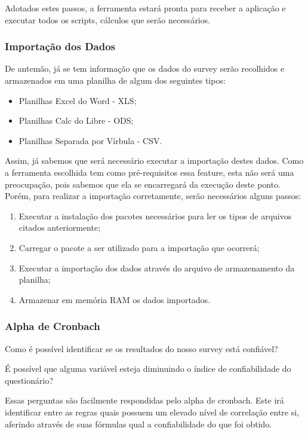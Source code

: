Adotados estes passos, a ferramenta estará pronta para receber a aplicação e executar todos os scripts, cálculos que serão
necessários.

\subsubsection{Importação dos Dados}
\label{sub:importa_o_dos_dados}
De antemão, já se tem informação que  os dados do survey serão recolhidos e armazenados em uma planilha de algum dos seguintes tipos:

\begin{itemize}
    \item Planilhas Excel do Word - XLS;
    \item Planilhas Calc do Libre - ODS;
    \item Planilhas Separada por Vírbula - CSV.
\end{itemize}

Assim, já sabemos que será necessário executar a importação destes dados. Como a ferramenta escolhida tem como pré-requisitos
essa feature, esta não será uma preocupação, pois sabemos que ela se encarregará da execução deste ponto. Porém, para realizar
a importação corretamente, serão necessários alguns passos:

\begin{enumerate}
    \item Executar a instalação dos pacotes necessários para ler os tipos de arquivos citados anteriormente;
    \item Carregar o pacote a ser utilizado para a importação que ocorrerá;
    \item Executar a importação dos dados através do arquivo de armazenamento da planilha;
    \item Armazenar em memória RAM os dados importados.
\end{enumerate}

\subsubsection{Alpha de Cronbach}
\label{sub:alpha_de_cronbach}
Como é possível identificar se os resultados do nosso survey está confiável?

É possível que alguma variável esteja diminuindo o índice de confiabilidade do questionário?

Essas perguntas são facilmente respondidas pelo alpha de cronbach. Este irá identificar entre as regras quais possuem
um elevado nível de correlação entre si, aferindo através de suas fórmulas qual a confiabilidade do que foi obtido.

